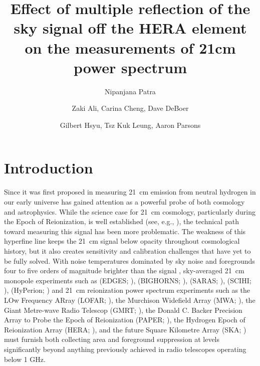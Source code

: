 \documentclass[iop]{emulateapj}
\begin{document}
\title{Effect of multiple reflection of the sky signal off the HERA element on the measurements of 21cm power spectrum} 

\author{Nipanjana Patra }


\author{Zaki Ali, Carina Cheng, Dave DeBoer}
\author{Gilbert Hsyu, Tsz Kuk Leung, Aaron Parsons}


\begin{abstract}
\end{abstract}


\section{Introduction}

Since it was first proposed in \citep{Shaver_et_al1999} measuring 21~cm
emission from neutral hydrogen in our early universe has gained attention as a
powerful probe of both cosmology and astrophysics.  While the science case for
21~cm cosmology, particularly during the Epoch of Reionization, is well
established (see, e.g.,
\citep{furlanetto_et_al2006,morales_wyithe2010,pritchard_loeb2012}),
the technical path toward measuring this signal has been more problematic.  The
weakness of this hyperfine line keeps the 21~cm signal below opacity throughout
cosmological history, but it also creates sensitivity and calibration
challenges that have yet to be fully solved.  With noise temperatures dominated
by sky noise \citep{XXX} and foregrounds four to five orders of magnitude
brighter than the signal \citep{XXX}, 
sky-averaged 21~cm monopole experiments such as
(EDGES; \citealt{XXX}),
(BIGHORNS; \citealt{XXX}),
(SARAS; \citealt{patra_et_al2014}),
(SCIHI; \citealt{voytek_et_al2014}),
(HyPerion; \citealt{presley_et_al2015})
and 21~cm reionization power spectrum experiments such as
the LOw Frequency ARray (LOFAR; \citealt{XXX}),
the Murchison Widefield Array (MWA; \citealt{XXX}),
the Giant Metre-wave Radio Telescop (GMRT; \citealt{XXX}),
the Donald C. Backer Precision Array to Probe the Epoch of Reionization (PAPER; \citealt{parsons_et_al2010}),
the Hydrogen Epoch of Reionization Array (HERA; \citealt{XXX}),
and the future Square Kilometre Array (SKA; \citealt{XXX})
must
furnish both collecting area and foreground suppression at levels significantly
beyond anything previously achieved in radio telescopes operating below 1 GHz.
\end{document}
